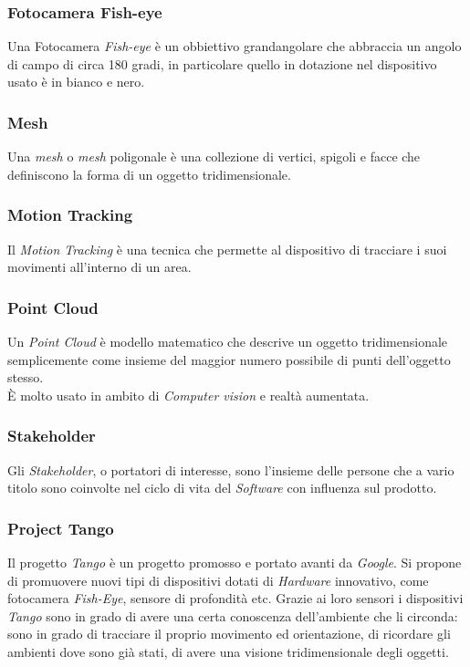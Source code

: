 \subsubsection{Fotocamera Fish-eye}
Una Fotocamera \emph{Fish-eye} è un obbiettivo grandangolare che abbraccia un angolo di campo di circa 180 gradi, in particolare quello in dotazione nel dispositivo usato è in bianco e nero.

\subsubsection{Mesh}
Una \emph{mesh} o \emph{mesh} poligonale è una collezione di vertici, spigoli e facce che definiscono la forma di un oggetto tridimensionale.

\subsubsection{Motion Tracking}
Il \emph{Motion Tracking} è una tecnica che permette al dispositivo di tracciare i suoi movimenti all'interno di un area.

\subsubsection{Point Cloud}
Un \emph{Point Cloud} è modello matematico che descrive un oggetto tridimensionale semplicemente come insieme del maggior numero possibile di punti dell'oggetto stesso.\\
È molto usato in ambito di \emph{Computer vision} e realtà aumentata.

\subsubsection{Stakeholder}
Gli \emph{Stakeholder}, o portatori di interesse, sono l'insieme delle persone che a vario titolo sono coinvolte nel ciclo di vita del \emph{Software} con influenza sul prodotto.

\subsubsection{Project Tango}
Il progetto \emph{Tango} è un progetto promosso e portato avanti da \emph{Google}. Si propone di promuovere nuovi tipi di dispositivi dotati di \emph{Hardware} innovativo, come fotocamera \emph{Fish-Eye}, sensore di profondità etc. Grazie ai loro sensori i dispositivi \emph{Tango} sono in grado di avere una certa conoscenza dell'ambiente che li circonda: sono in grado di tracciare il proprio movimento ed orientazione, di ricordare gli ambienti dove sono già stati, di avere una visione tridimensionale degli oggetti.

